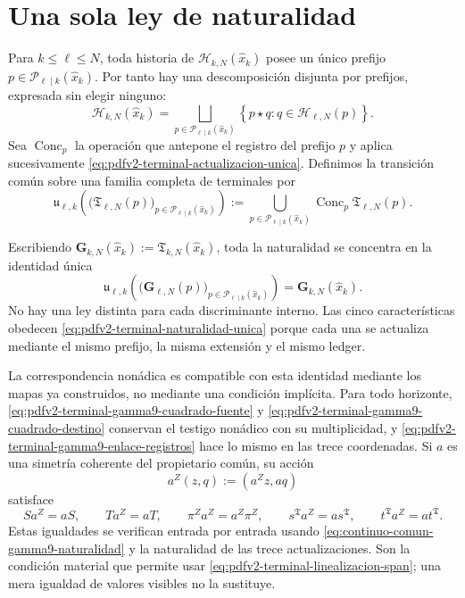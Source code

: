 \section{Una sola ley de naturalidad}

Para \(k\leq\ell\leq N\), toda historia de
\(\mathscr H_{k,N}(\widehat x_k)\) posee un \'unico prefijo
\(p\in\mathscr P_{\ell\mid k}(\widehat x_k)\). Por tanto hay una descomposici\'on
disjunta por prefijos, expresada sin elegir ninguno:
\begin{equation}
\label{eq:pdfv2-terminal-particion-historias}
 \mathscr H_{k,N}(\widehat x_k)
 =\bigsqcup_{p\in\mathscr P_{\ell\mid k}(\widehat x_k)}
 \left\{p\star q:q\in\mathscr H_{\ell,N}(p)\right\}.
\end{equation}
Sea \(\operatorname{Conc}_p\) la operaci\'on que antepone el registro del
prefijo \(p\) y aplica sucesivamente
\eqref{eq:pdfv2-terminal-actualizacion-unica}. Definimos la transici\'on
com\'un sobre una familia completa de terminales por
\begin{equation}
\label{eq:pdfv2-terminal-transicion-comun}
 \mathfrak u_{\ell,k}
 \left(
   \bigl(\mathfrak T_{\ell,N}(p)\bigr)_{p\in\mathscr P_{\ell\mid k}(\widehat x_k)}
 \right)
 :=\bigcup_{p\in\mathscr P_{\ell\mid k}(\widehat x_k)}
   \operatorname{Conc}_p\mathfrak T_{\ell,N}(p).
\end{equation}

Escribiendo
\(\mathbf G_{k,N}(\widehat x_k):=\mathfrak T_{k,N}(\widehat x_k)\), toda la naturalidad se
concentra en la identidad \'unica
\begin{equation}
\label{eq:pdfv2-terminal-naturalidad-unica}
 \boxed{
 \mathfrak u_{\ell,k}
 \left(
   \bigl(\mathbf G_{\ell,N}(p)\bigr)_{p\in\mathscr P_{\ell\mid k}(\widehat x_k)}
 \right)
 =\mathbf G_{k,N}(\widehat x_k).}
\end{equation}
No hay una ley distinta para cada discriminante interno. Las cinco
caracter\'isticas obedecen
\eqref{eq:pdfv2-terminal-naturalidad-unica} porque cada una se actualiza
mediante el mismo prefijo, la misma extensi\'on y el mismo ledger.

La correspondencia non\'adica es compatible con esta identidad mediante los
mapas ya construidos, no mediante una condici\'on impl\'icita. Para todo
horizonte, \eqref{eq:pdfv2-terminal-gamma9-cuadrado-fuente} y
\eqref{eq:pdfv2-terminal-gamma9-cuadrado-destino} conservan el testigo
non\'adico con su multiplicidad, y
\eqref{eq:pdfv2-terminal-gamma9-enlace-registros} hace lo mismo en las
trece coordenadas. Si \(a\) es una simetr\'ia coherente del propietario
com\'un, su acci\'on
\[
 a^Z(z,q):=(a^Zz,aq)
\]
satisface
\begin{equation}
\label{eq:pdfv2-terminal-gamma9-equivarianza-completa}
 S a^Z=aS,\qquad T a^Z=aT,\qquad
 \pi^Za^Z=a^Z\pi^Z,\qquad
 s^{\mathfrak T}a^Z=as^{\mathfrak T},\qquad
 t^{\mathfrak T}a^Z=at^{\mathfrak T}.
\end{equation}
Estas igualdades se verifican entrada por entrada usando
\eqref{eq:continuo-comun-gamma9-naturalidad} y la naturalidad de las trece
actualizaciones. Son la condici\'on material que permite usar
\eqref{eq:pdfv2-terminal-linealizacion-span}; una mera igualdad de valores
visibles no la sustituye.

